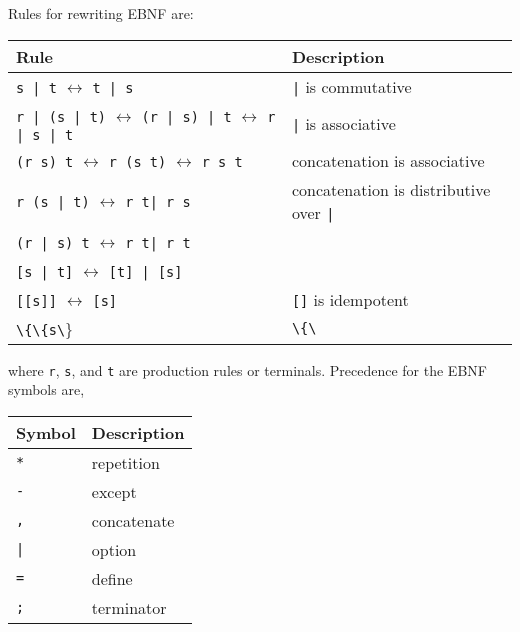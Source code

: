 Rules for rewriting EBNF are:
\begin{center}
  \begin{tabularx}{\linewidth}{|l|X|}
    \hline
    Rule & Description\\
    \hline
    \lstinline[language=ebnf]{s | t} $\leftrightarrow$ \lstinline[language=ebnf]{t | s} & \lstinline[language=ebnf]{|} is commutative \\
    \hline
    \lstinline[language=ebnf]{r | (s | t)} $\leftrightarrow$ \lstinline[language=ebnf]{(r | s) | t} $\leftrightarrow$ \lstinline[language=ebnf]{r | s | t} & \lstinline[language=ebnf]{|} is associative \\
    \hline
    \lstinline[language=ebnf]{(r s) t} $\leftrightarrow$ \lstinline[language=ebnf]{r (s t)} $\leftrightarrow$ \lstinline[language=ebnf]{r s t} & concatenation is associative \\
    \hline
    \lstinline[language=ebnf]{r (s | t)} $\leftrightarrow$ \lstinline[language=ebnf]{r t| r s} & concatenation is distributive over \lstinline[language=ebnf]{|}\\
    \lstinline[language=ebnf]{(r | s) t} $\leftrightarrow$ \lstinline[language=ebnf]{r t| r t} &\\
    \hline
    \lstinline[language=ebnf]{[s | t]} $\leftrightarrow$ \lstinline[language=ebnf]{[t] | [s]} &\\
    \hline
    \lstinline[language=ebnf]{[[s]]} $\leftrightarrow$ \lstinline[language=ebnf]{[s]} & \lstinline[language=ebnf]{[]} is idempotent \\
    \hline
    \lstinline[language=ebnf]{\{\{s\}\}} $\leftrightarrow$ \lstinline[language=ebnf]{\{s\}} & \lstinline[language=ebnf]{\{\}} is idempotent \\
    \hline
  \end{tabularx}
\end{center}
where \lstinline[language=ebnf]{r}, \lstinline[language=ebnf]{s}, and \lstinline[language=ebnf]{t} are production rules or terminals. Precedence for the EBNF symbols are,
\begin{center}
  \begin{tabular}{|l|l|}
    \hline
    Symbol & Description\\
    \hline
    \lstinline[language=ebnf]!*! & repetition\\
    \hline
    \lstinline[language=ebnf]!-! & except\\
    \hline
    \lstinline[language=ebnf]!,! & concatenate\\
    \hline
    \lstinline[language=ebnf]!|! & option\\
    \hline
    \lstinline[language=ebnf]!=! & define\\
    \hline
    \lstinline[language=ebnf]!;! & terminator\\
    \hline
  \end{tabular}
\end{center}
